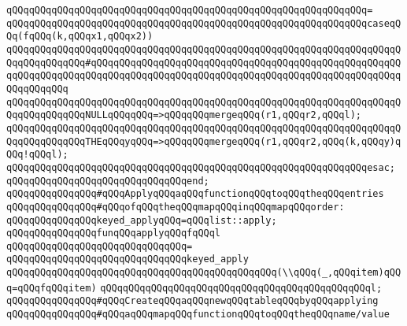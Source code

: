 \verb|qQQqqQQqqQQqqQQqqQQqqQQqqQQqqQQqqQQqqQQqqQQqqQQqqQQqqQQqqQQqqQQq=|\newline
\verb|qQQqqQQqqQQqqQQqqQQqqQQqqQQqqQQqqQQqqQQqqQQqqQQqqQQqqQQqqQQqqQQqcaseqQQq(fqQQq(k,qQQqx1,qQQqx2))|\newline
\verb|qQQqqQQqqQQqqQQqqQQqqQQqqQQqqQQqqQQqqQQqqQQqqQQqqQQqqQQqqQQqqQQqqQQqqQQqqQQqqQQqqQQq#qQQqqQQqqQQqqQQqqQQqqQQqqQQqqQQqqQQqqQQqqQQqqQQqqQQqqQQqqQQqqQQqqQQqqQQqqQQqqQQqqQQqqQQqqQQqqQQqqQQqqQQqqQQqqQQqqQQqqQQqqQQqqQQqqQQqqQQq|\newline
\verb|qQQqqQQqqQQqqQQqqQQqqQQqqQQqqQQqqQQqqQQqqQQqqQQqqQQqqQQqqQQqqQQqqQQqqQQqqQQqqQQqqQQqNULLqQQqqQQq=>qQQqqQQqmergeqQQq(r1,qQQqr2,qQQql);|\newline
\verb|qQQqqQQqqQQqqQQqqQQqqQQqqQQqqQQqqQQqqQQqqQQqqQQqqQQqqQQqqQQqqQQqqQQqqQQqqQQqqQQqqQQqTHEqQQqyqQQq=>qQQqqQQqmergeqQQq(r1,qQQqr2,qQQq(k,qQQqy)qQQq!qQQql);|\newline
\verb|qQQqqQQqqQQqqQQqqQQqqQQqqQQqqQQqqQQqqQQqqQQqqQQqqQQqqQQqqQQqqQQqesac;|\newline
\newline
\verb|qQQqqQQqqQQqqQQqqQQqqQQqqQQqqQQqend;|\newline
\newline
\newline
\verb|qQQqqQQqqQQqqQQq#qQQqApplyqQQqaqQQqfunctionqQQqtoqQQqtheqQQqentries|\newline
\verb|qQQqqQQqqQQqqQQq#qQQqofqQQqtheqQQqmapqQQqinqQQqmapqQQqorder:|\newline
\newline
\verb|qQQqqQQqqQQqqQQqkeyed_applyqQQq=qQQqlist::apply;|\newline
\newline
\verb|qQQqqQQqqQQqqQQqfunqQQqapplyqQQqfqQQql|\newline
\verb|qQQqqQQqqQQqqQQqqQQqqQQqqQQqqQQq=|\newline
\verb|qQQqqQQqqQQqqQQqqQQqqQQqqQQqqQQqkeyed_apply|\newline
\verb|qQQqqQQqqQQqqQQqqQQqqQQqqQQqqQQqqQQqqQQqqQQqqQQq(\\qQQq(_,qQQqitem)qQQq=qQQqfqQQqitem)|\newline
\verb|qQQqqQQqqQQqqQQqqQQqqQQqqQQqqQQqqQQqqQQqqQQqqQQql;|\newline
\newline
\verb|qQQqqQQqqQQqqQQq#qQQqCreateqQQqaqQQqnewqQQqtableqQQqbyqQQqapplying|\newline
\verb|qQQqqQQqqQQqqQQq#qQQqaqQQqmapqQQqfunctionqQQqtoqQQqtheqQQqname/value|\newline
